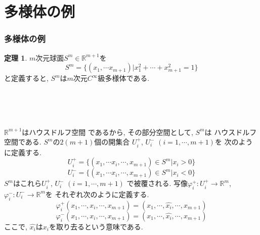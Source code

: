 \documentclass[dvipdfmx,cjk]{beamer}
\theoremstyle{definition}
\newtheorem{thm}[dfn]{\textbf{ 定理 }}
\begin{document}
  \section{多様体の例}
  \begin{frame}
  \frametitle{多様体の例}
  \begin{thm}
    $m$次元球面$S^m \in \mathbb{R}^{m+1}$を
    $$S^m=\{(x_1,\cdots x_{m+1})|x_1^2+\cdots +x_{m+1}^2=1\}$$
    と定義すると, $S^m$は$m$次元$C^{\infty}$級多様体である. 
  \end{thm}
  \ \\
  \ \\
  \ \\
\end{frame}


  \begin{frame}
    $\mathbb{R}^{m+1}$はハウスドルフ空間
        であるから, その部分空間として, $S^m$は
        ハウスドルフ空間である. 
        $S^m$の$2(m+1)$個の開集合
        $U_i^+$, $U_i^-$ $(i=1,\cdots ,m+1)$を
        次のように定義する. 
        $$U_i^+ = \{(x_1, \cdots x_i, \cdots ,x_{m+1})\in S^m|x_i>0\}$$
        $$U_i^- = \{(x_1, \cdots x_i, \cdots ,x_{m+1})\in S^m|x_i<0\}$$
        $S^m$はこれら$U_i^+$, $U_i^-$ $(i=1,\cdots ,m+1)$
        で被覆される. 写像$\varphi_i^+:U_i^+ \rightarrow \mathbb{R}^m$, 
        $\varphi_i^-:U_i^- \rightarrow \mathbb{R}^m$を
        それぞれ次のように定義する. 
        $$\varphi_i^+(x_1,\cdots ,x_i,\cdots, x_{m+1})=(x_1,\cdots ,\hat{x_i},\cdots ,x_{m+1})$$
        $$\varphi_i^-(x_1,\cdots ,x_i,\cdots, x_{m+1})=(x_1,\cdots ,\hat{x_i},\cdots ,x_{m+1})$$
        ここで, $\hat{x_i}$は$x_i$を取り去るという意味である. 
      \end{frame}
\end{document}
